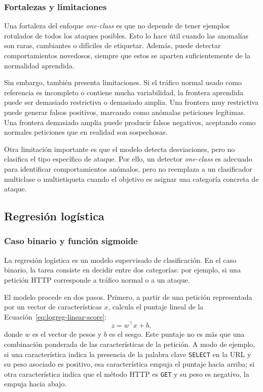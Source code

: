 \documentclass[12pt,oneside]{report}
\begin{document}
\subsubsection{Fortalezas y limitaciones}

Una fortaleza del enfoque \textit{one-class} es que no depende de tener ejemplos rotulados de todos los ataques posibles. Esto lo hace útil cuando las anomalías son raras, cambiantes o difíciles de etiquetar. Además, puede detectar comportamientos novedosos, siempre que estos se aparten suficientemente de la normalidad aprendida.

Sin embargo, también presenta limitaciones. Si el tráfico normal usado como referencia es incompleto o contiene mucha variabilidad, la frontera aprendida puede ser demasiado restrictiva o demasiado amplia. Una frontera muy restrictiva puede generar falsos positivos, marcando como anómalas peticiones legítimas. Una frontera demasiado amplia puede producir falsos negativos, aceptando como normales peticiones que en realidad son sospechosas.

Otra limitación importante es que el modelo detecta desviaciones, pero no clasifica el tipo específico de ataque. Por ello, un detector \textit{one-class} es adecuado para identificar comportamientos anómalos, pero no reemplaza a un clasificador multiclase o multietiqueta cuando el objetivo es asignar una categoría concreta de ataque.

\subsection{Regresión logística}

\subsubsection{Caso binario y función sigmoide}

La regresión logística es un modelo supervisado de clasificación. En el caso
binario, la tarea consiste en decidir entre dos categorías: por ejemplo,
si una petición HTTP corresponde a tráfico normal o a un ataque.

El modelo procede en dos pasos. Primero, a partir de una petición
representada por un vector de características $x$, calcula el puntaje lineal de la Ecuación~\eqref{eq:logreg-linear-score}:
\begin{equation}
\label{eq:logreg-linear-score}
z=w^\top x+b,
\end{equation}
donde $w$ es el vector de pesos y $b$ es el sesgo. Este puntaje no es más
que una combinación ponderada de las características de la petición. A modo
de ejemplo, si una característica indica la presencia de la palabra clave
\texttt{SELECT} en la URL y su peso asociado es positivo, esa característica
empuja el puntaje hacia arriba; si otra característica indica que el método
HTTP es \texttt{GET} y su peso es negativo, la empuja hacia abajo.
\end{document}
